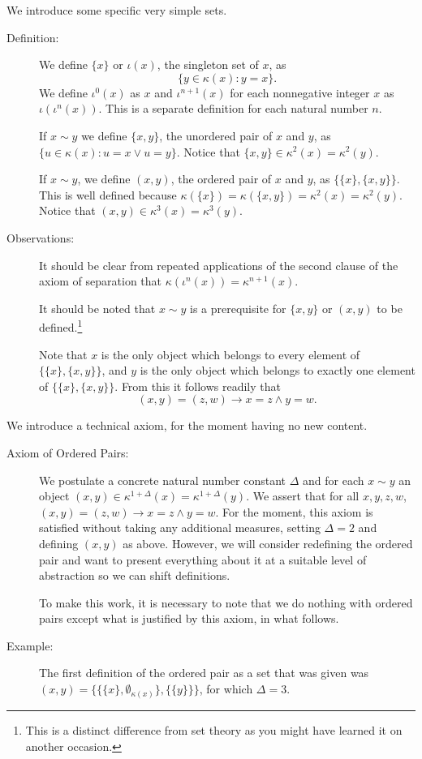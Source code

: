 \documentclass[12pt]{article}
\begin{document}
We introduce some specific very simple sets.

\begin{description}

\item[Definition:]  We define $\{x\}$ or $\iota(x)$, the singleton set of $x$, as $$\{y \in \kappa(x):y=x\}.$$  We define $\iota^0(x)$ 
as $x$ and $\iota^{n+1}(x)$ for each nonnegative integer $x$ as $\iota(\iota^n(x))$.  This is a separate definition for each natural number $n$.

If $x \sim y$ we define $\{x,y\}$, the unordered pair of $x$ and $y$, as \newline $\{u \in \kappa(x):u = x \vee u = y\}$.  Notice
that $\{x,y\} \in \kappa^2(x)=\kappa^2(y)$.

If $x\sim y$, we define $(x,y)$, the ordered pair of $x$ and $y$, as $\{\{x\},\{x,y\}\}$.  This is well defined because $\kappa(\{x\}) = \kappa(\{x,y\}) = \kappa^2(x) = \kappa^2(y)$.  Notice that $(x,y) \in \kappa^3(x) = \kappa^3(y)$.

\item[Observations:]  It should be clear from repeated applications of the second clause of the axiom of separation that $\kappa(\iota^n(x)) = \kappa^{n+1}(x)$.

It should be noted that $x \sim y$ is a prerequisite for $\{x,y\}$ or $(x,y)$ to be defined.\footnote{This is a distinct difference from set theory as you might have learned it on another occasion.}

Note that $x$ is the only object which belongs to every element of $\{\{x\},\{x,y\}\}$, and $y$ is the only object which belongs to exactly one element of $\{\{x\},\{x,y\}\}$.  From this it follows readily that $$(x,y)=(z,w) \rightarrow x=z \wedge y=w.$$

\end{description}

We introduce a technical axiom, for the moment having no new content.

\begin{description}

\item[Axiom of Ordered Pairs:]  We postulate a concrete natural number constant $\Delta$ and
for each $x \sim y$ an object $(x,y) \in \kappa^{1+\Delta}(x) = \kappa^{1+\Delta}(y)$.  We assert that for all $x,y,z,w$, $(x,y)=(z,w) \rightarrow x=z \wedge y = w$.  For the moment,
this axiom is satisfied without taking any additional measures, setting $\Delta=2$ and defining $(x,y)$ as above.   However, we will consider redefining the ordered pair and want to present everything about it at a suitable level of abstraction so we can shift definitions.

To make this work, it is necessary to note that we do nothing with ordered pairs except what is justified by this axiom, in what follows.

\item[Example:]  The first definition of the ordered pair as a set that was given was $(x,y)=\{\{\{x\},\emptyset_{\kappa(x)}\},\{\{y\}\}\}$, for which $\Delta=3$.

\end{description}
\end{document}
